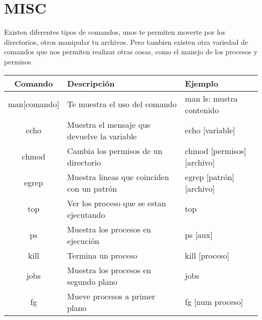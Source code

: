 \documentclass[12pt]{article}
\begin{document}
\section{MISC}
Existen diferentes tipos de comandos, unos te permiten moverte por los directorios, otros manipular tu archivos. Pero tambien existen otra variedad de comandos que nos permiten realizar otras cosas, como el manejo de los procesos y permisos.
\\ \begin{tabular}{|c|l|l|}
\hline
Comando & Descripción & Ejemplo \\
\hline
man[comando] & Te muestra el uso del comando & man ls: mustra contenido \\ \hline
echo & Muestra el mensaje que devuelve la variable & echo [variable] \\ \hline
chmod & Cambia los permisos de un directorio & chmod [permisos] [archivo] \\ \hline
egrep & Muestra lineas que coinciden con un patrón & egrep [patrón] [archivo] \\ \hline
top & Ver los proceso que se estan ejecutando & top \\ \hline
ps & Muestra los procesos en ejecución & ps [aux] \\ \hline
kill & Termina un proceso & kill [proceso] \\ \hline
jobs & Muestra los procesos en segundo plano & jobs \\ \hline
fg & Mueve procesos a primer plano & fg [num proceso] \\ \hline
\end{tabular} 


\end{document}
